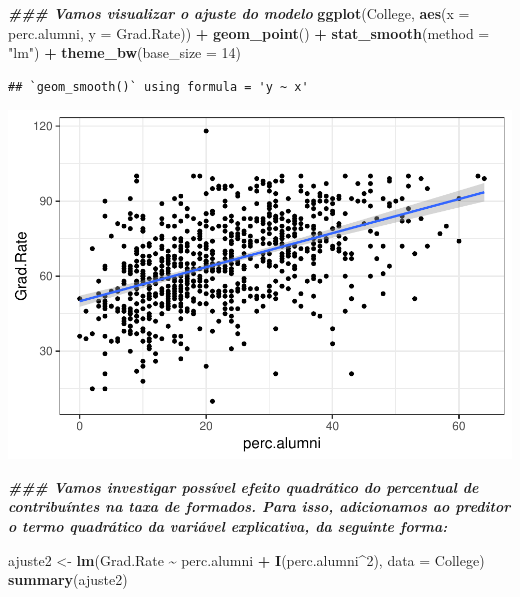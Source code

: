 \documentclass[
]{article}
\newenvironment{Shaded}{\begin{snugshade}}{\end{snugshade}}
\newcommand{\AttributeTok}[1]{\textcolor[rgb]{0.13,0.29,0.53}{#1}}
\newcommand{\DecValTok}[1]{\textcolor[rgb]{0.00,0.00,0.81}{#1}}
\newcommand{\DocumentationTok}[1]{\textcolor[rgb]{0.56,0.35,0.01}{\textbf{\textit{#1}}}}
\newcommand{\FunctionTok}[1]{\textcolor[rgb]{0.13,0.29,0.53}{\textbf{#1}}}
\newcommand{\NormalTok}[1]{#1}
\newcommand{\OtherTok}[1]{\textcolor[rgb]{0.56,0.35,0.01}{#1}}
\newcommand{\SpecialCharTok}[1]{\textcolor[rgb]{0.81,0.36,0.00}{\textbf{#1}}}
\newcommand{\StringTok}[1]{\textcolor[rgb]{0.31,0.60,0.02}{#1}}
\begin{document}
\begin{Shaded}
\begin{Highlighting}[]
\DocumentationTok{\#\#\# Vamos visualizar o ajuste do modelo}
\FunctionTok{ggplot}\NormalTok{(College, }\FunctionTok{aes}\NormalTok{(}\AttributeTok{x =}\NormalTok{ perc.alumni, }\AttributeTok{y =}\NormalTok{ Grad.Rate)) }\SpecialCharTok{+} \FunctionTok{geom\_point}\NormalTok{() }\SpecialCharTok{+}
    \FunctionTok{stat\_smooth}\NormalTok{(}\AttributeTok{method =} \StringTok{"lm"}\NormalTok{) }\SpecialCharTok{+}
    \FunctionTok{theme\_bw}\NormalTok{(}\AttributeTok{base\_size =} \DecValTok{14}\NormalTok{)}
\end{Highlighting}
\end{Shaded}

\begin{verbatim}
## `geom_smooth()` using formula = 'y ~ x'
\end{verbatim}

\includegraphics{Modelos_Estatisticos-2024-08-10_files/figure-latex/unnamed-chunk-13-1.pdf}

\begin{Shaded}
\begin{Highlighting}[]
\DocumentationTok{\#\#\# Vamos investigar possível efeito quadrático do percentual de contribuíntes na taxa de formados. Para isso, adicionamos ao preditor o termo quadrático da variável explicativa, da seguinte forma:}

\NormalTok{ajuste2 }\OtherTok{\textless{}{-}} \FunctionTok{lm}\NormalTok{(Grad.Rate }\SpecialCharTok{\textasciitilde{}}\NormalTok{ perc.alumni }\SpecialCharTok{+} \FunctionTok{I}\NormalTok{(perc.alumni}\SpecialCharTok{\^{}}\DecValTok{2}\NormalTok{), }\AttributeTok{data =}\NormalTok{ College)}
\FunctionTok{summary}\NormalTok{(ajuste2)}
\end{Highlighting}
\end{Shaded}
\end{document}

